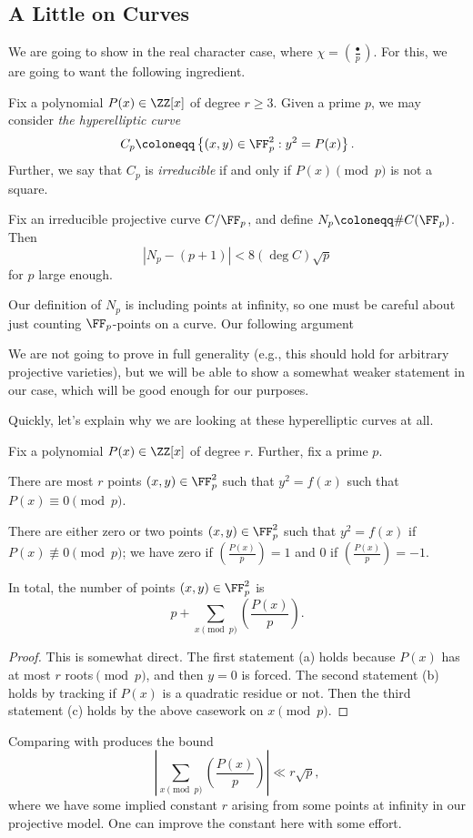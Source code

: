 \documentclass[../notes.tex]{subfiles}
\begin{document}
\subsection{A Little on Curves}
We are going to show  in the real character case, where $\chi=\left(\frac\bullet p\right)$. For this, we are going to want the following ingredient.
\begin{definition}
	Fix a polynomial $P(x)\in\ZZ[x]$ of degree $r\ge3$. Given a prime $p$, we may consider \textit{the hyperelliptic curve}
	\[C_p\coloneqq\left\{(x,y)\in\FF_p^2:y^2=P(x)\right\}.\]
	Further, we say that $C_p$ is \textit{irreducible} if and only if $P(x)\pmod p$ is not a square.
\end{definition}
\begin{theorem} \label{thm:rh-curves}
	Fix an irreducible projective curve $C/\FF_p$, and define $N_p\coloneqq\#C(\FF_p)$. Then
	\[|N_p-(p+1)|<8(\deg C)\sqrt p\]
	for $p$ large enough.
\end{theorem}
\begin{remark}
	Our definition of $N_p$ is including points at infinity, so one must be careful about just counting $\FF_p$-points on a curve. Our following argument
\end{remark}
We are not going to prove  in full generality (e.g., this should hold for arbitrary projective varieties), but we will be able to show a somewhat weaker statement in our case, which will be good enough for our purposes.

Quickly, let's explain why we are looking at these hyperelliptic curves at all.
\begin{lemma} \label{lem:char-sum-from-point}
	Fix a polynomial $P(x)\in\ZZ[x]$ of degree $r$. Further, fix a prime $p$.
	\begin{listalph}
		\item There are most $r$ points $(x,y)\in\FF_p^2$ such that $y^2=f(x)$ such that $P(x)\equiv0\pmod p$.
		\item There are either zero or two points $(x,y)\in\FF_p^2$ such that $y^2=f(x)$ if $P(x)\not\equiv0\pmod p$; we have zero if $\left(\frac{P(x)}p\right)=1$ and $0$ if $\left(\frac{P(x)}p\right)=-1$.
		\item In total, the number of points $(x,y)\in\FF_p^2$ is
		\[p+\sum_{x\pmod p}\left(\frac{P(x)}p\right).\]
	\end{listalph}
\end{lemma}
\begin{proof}
	This is somewhat direct. The first statement (a) holds because $P(x)$ has at most $r$ roots$\pmod p$, and then $y=0$ is forced. The second statement (b) holds by tracking if $P(x)$ is a quadratic residue or not. Then the third statement (c) holds by the above casework on $x\pmod p$.
\end{proof}
Comparing  with  produces the bound
\[\left|\sum_{x\pmod p}\left(\frac{P(x)}p\right)\right|\ll r\sqrt p,\]
where we have some implied constant $r$ arising from some points at infinity in our projective model. One can improve the constant here with some effort.
\end{document}
